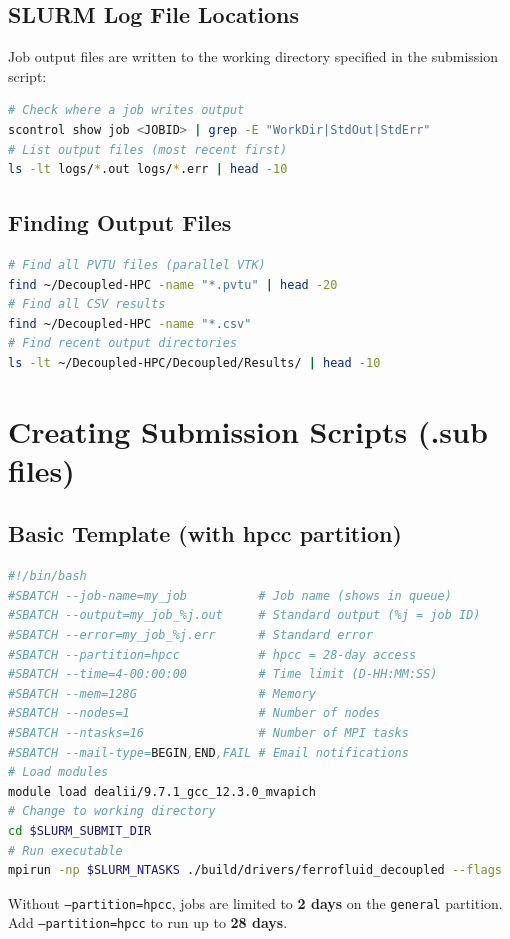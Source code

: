 \documentclass[11pt,a4paper]{article}
\begin{document}
\subsection{SLURM Log File Locations}
Job output files are written to the working directory specified in the submission script:
\begin{lstlisting}[language=bash]
# Check where a job writes output
scontrol show job <JOBID> | grep -E "WorkDir|StdOut|StdErr"
# List output files (most recent first)
ls -lt logs/*.out logs/*.err | head -10
\end{lstlisting}
\subsection{Finding Output Files}
\begin{lstlisting}[language=bash]
# Find all PVTU files (parallel VTK)
find ~/Decoupled-HPC -name "*.pvtu" | head -20
# Find all CSV results
find ~/Decoupled-HPC -name "*.csv"
# Find recent output directories
ls -lt ~/Decoupled-HPC/Decoupled/Results/ | head -10
\end{lstlisting}
\section{Creating Submission Scripts (.sub files)}
\subsection{Basic Template (with hpcc partition)}
\begin{lstlisting}[language=bash]
#!/bin/bash
#SBATCH --job-name=my_job          # Job name (shows in queue)
#SBATCH --output=my_job_%j.out     # Standard output (%j = job ID)
#SBATCH --error=my_job_%j.err      # Standard error
#SBATCH --partition=hpcc           # hpcc = 28-day access
#SBATCH --time=4-00:00:00          # Time limit (D-HH:MM:SS)
#SBATCH --mem=128G                 # Memory
#SBATCH --nodes=1                  # Number of nodes
#SBATCH --ntasks=16                # Number of MPI tasks
#SBATCH --mail-type=BEGIN,END,FAIL # Email notifications
# Load modules
module load dealii/9.7.1_gcc_12.3.0_mvapich
# Change to working directory
cd $SLURM_SUBMIT_DIR
# Run executable
mpirun -np $SLURM_NTASKS ./build/drivers/ferrofluid_decoupled --flags
\end{lstlisting}
\begin{warningbox}
Without \texttt{--partition=hpcc}, jobs are limited to \textbf{2 days}
on the \texttt{general} partition. Add \texttt{--partition=hpcc} to
run up to \textbf{28 days}.
\end{warningbox}
\end{document}
